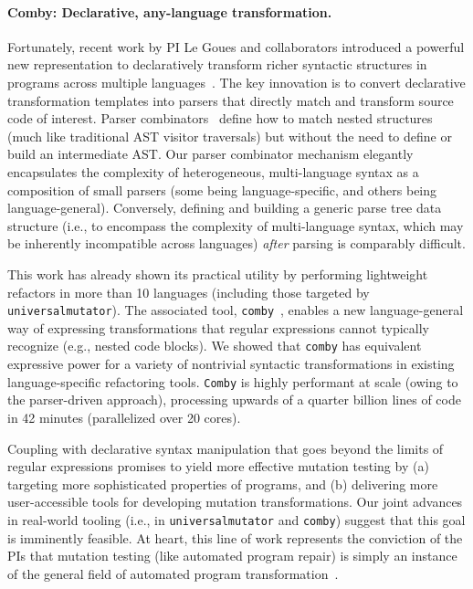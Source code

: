 \paragraph{Comby: Declarative, any-language transformation.} Fortunately, recent work by PI
Le Goues and collaborators introduced a powerful new representation to
declaratively transform richer syntactic structures in programs across multiple
languages~\cite{rvt-ppc}. The key innovation is to convert declarative
transformation templates into parsers that directly match and transform source
code of interest. Parser
combinators~\cite{Hutton96monadicparser} define how to match nested structures (much like traditional AST
visitor traversals) but without the need to define or build an intermediate AST.
Our parser combinator mechanism elegantly encapsulates the complexity of
heterogeneous, multi-language syntax as a composition of small parsers (some
being language-specific, and others being language-general). Conversely, defining and
building a generic parse tree data structure (i.e., to encompass the complexity
of multi-language syntax, which may be inherently incompatible across languages)
\emph{after} parsing is comparably difficult.

This work has already shown its practical utility by performing lightweight
refactors in more than 10 languages (including those targeted by {\tt
  universalmutator}). The associated tool, {\tt comby}~\cite{comby-github},
enables a new language-general way of expressing transformations that regular
expressions cannot typically recognize (e.g., nested code blocks). We showed
that {\tt comby} has equivalent expressive power for a variety of nontrivial syntactic
transformations in existing language-specific refactoring tools. {\tt Comby} is
highly performant at scale (owing to the parser-driven approach), processing
upwards of a quarter billion lines of code in 42 minutes (parallelized over 20 cores).

Coupling with declarative syntax manipulation that goes beyond the limits
of regular expressions  promises to yield more effective mutation testing by (a) targeting more
sophisticated properties of programs, and (b) delivering more user-accessible
tools for developing mutation transformations. Our joint advances in
real-world tooling (i.e., in {\tt universalmutator} and {\tt comby}) suggest that
this goal is imminently feasible.  At heart, this line of work
represents the conviction of the PIs that mutation testing (like
automated program repair) is simply
an instance of the general field of automated program transformation~\cite{Ptransform}.

